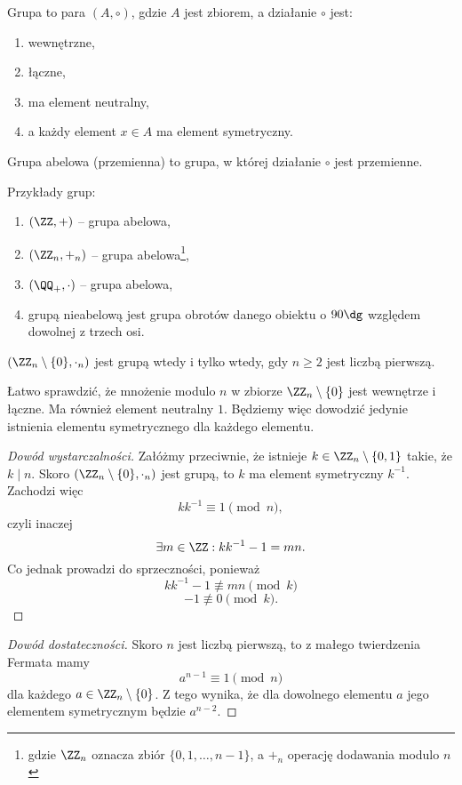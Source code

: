 \begin{definition}
    Grupa to para $(A, \circ)$, gdzie $A$ jest zbiorem, a działanie $\circ$ jest:
    \begin{enumerate}
        \item wewnętrzne,
        \item łączne,
        \item ma element neutralny,
        \item a każdy element $x \in A$ ma element symetryczny.
    \end{enumerate}
\end{definition}

\begin{definition}
    Grupa abelowa (przemienna) to grupa, w której działanie $\circ$ jest przemienne.
\end{definition}

\begin{example}
    Przykłady grup:
    \begin{enumerate}
        \item $(\ZZ, +)$ -- grupa abelowa,
        \item $(\ZZ_n, +_n)$ -- grupa abelowa\footnote{gdzie $\ZZ_n$ oznacza zbiór $\{0, 1, \ldots, n-1\}$, a $+_n$ operację dodawania modulo $n$},
        \item $(\QQ_+, \cdot)$ -- grupa abelowa,
        \item grupą nieabelową jest grupa obrotów danego obiektu o $90\dg$ względem dowolnej z trzech osi.
    \end{enumerate}
\end{example}

\begin{theorem}
    \label{t:prime_n->group}
    $(\ZZ_n \setminus \{0\}, \cdot_n)$ jest grupą wtedy i tylko wtedy, gdy $n \geq 2$ jest liczbą pierwszą.
\end{theorem}
Łatwo sprawdzić, że mnożenie modulo $n$ w zbiorze $\ZZ_n \setminus \{0\}$ jest wewnętrze i łączne. Ma również element neutralny $1$. Będziemy więc dowodzić jedynie istnienia elementu symetrycznego dla każdego elementu.
\begin{proof}[Dowód wystarczalności]\renewcommand{\qedsymbol}{}
    Załóżmy przeciwnie, że istnieje $k \in \ZZ_n \setminus \{0, 1\}$ takie, że $k \mid n$. Skoro $(\ZZ_n \setminus \{0\}, \cdot_n)$ jest grupą, to $k$ ma element symetryczny $k^{-1}$. Zachodzi więc
    $$ kk^{-1} \equiv 1 \pmod{n}, $$
    czyli inaczej
    $$ \exists m \in \ZZ : kk^{-1} - 1 = mn. $$
    Co jednak prowadzi do sprzeczności, ponieważ
    $$ kk^{-1} - 1 \not\equiv mn \pmod{k} $$
    $$ - 1 \not\equiv 0 \pmod{k}. $$
\end{proof}
\begin{proof}[Dowód dostateczności]
    Skoro $n$ jest liczbą pierwszą, to z małego twierdzenia Fermata mamy
    $$ a^{n-1} \equiv 1 \pmod{n} $$
    dla każdego $a \in \ZZ_n \setminus \{0\}$.
    Z tego wynika, że dla dowolnego elementu $a$ jego elementem symetrycznym będzie $a^{n-2}$.
\end{proof}

